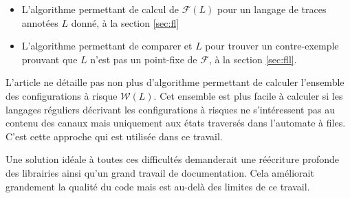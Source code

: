 \begin{itemize}
\begin{itemize}
    \item L'algorithme permettant de calcul de $\mathcal{F}(L)$ pour un langage de traces annotées $L$ donné, à la section \ref{sec:fl}
    \item L'algorithme permettant de comparer \fl et $L$ pour trouver un contre-exemple prouvant que $L$ n'est pas un point-fixe de $\mathcal{F}$, à la section \ref{sec:fll}.
  \end{itemize}
  L'article ne détaille pas non plus d'algorithme permettant de calculer l'ensemble des configurations à risque $\mathcal{W}(L)$. Cet ensemble est plus facile à calculer si les langages réguliers décrivant les configurations à risques ne s'intéressent pas au contenu des canaux mais uniquement aux états traversés dans l'automate à files. C'est cette approche qui est utilisée dans ce travail.
\end{itemize}

Une solution idéale à toutes ces difficultés demanderait une réécriture profonde des librairies ainsi qu'un grand travail de documentation. Cela améliorait grandement la qualité du code mais est au-delà des limites de ce travail.
